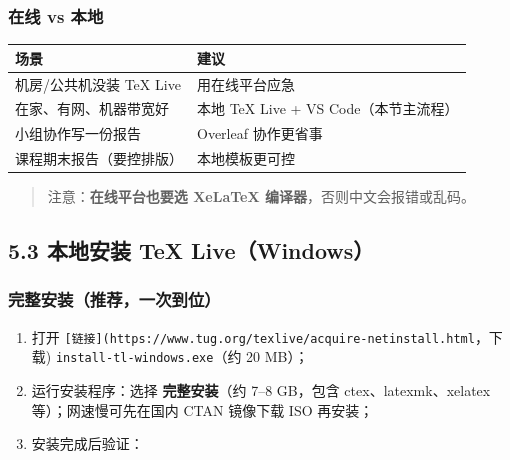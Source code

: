 \subsubsection{在线 vs 本地}\label{ux5728ux7ebf-vs-ux672cux5730}

{\def\LTcaptype{none} %
\begin{longtable}[]{@{}ll@{}}
\toprule\noalign{}
场景 & 建议 \\
\midrule\noalign{}
\endhead
\bottomrule\noalign{}
\endlastfoot
机房/公共机没装 TeX Live & 用在线平台应急 \\
在家、有网、机器带宽好 & 本地 TeX Live + VS Code（本节主流程） \\
小组协作写一份报告 & Overleaf 协作更省事 \\
课程期末报告（要控排版） & 本地模板更可控 \\
\end{longtable}
}

\begin{quote}
注意：\textbf{在线平台也要选 XeLaTeX 编译器}，否则中文会报错或乱码。
\end{quote}

\subsection{5.3 本地安装 TeX
Live（Windows）}\label{ux672cux5730ux5b89ux88c5-tex-livewindows}

\subsubsection{完整安装（推荐，一次到位）}\label{ux5b8cux6574ux5b89ux88c5ux63a8ux8350ux4e00ux6b21ux5230ux4f4d}

\begin{enumerate}
\def\labelenumi{\arabic{enumi}.}
\tightlist
\item
  打开
  \texttt{{[}链接{]}(https://www.tug.org/texlive/acquire-netinstall.html}，下载)
  \texttt{install-tl-windows.exe}（约 20 MB）；
\item
  运行安装程序：选择 \textbf{完整安装}（约 7--8 GB，包含
  ctex、latexmk、xelatex 等）；网速慢可先在国内 CTAN 镜像下载 ISO
  再安装；
\item
  安装完成后验证：
\end{enumerate}

\begin{Shaded}
\begin{Highlighting}[]
\OperatorTok{{-}{-}}
\OperatorTok{{-}{-}}
\end{Highlighting}
\end{Shaded}

